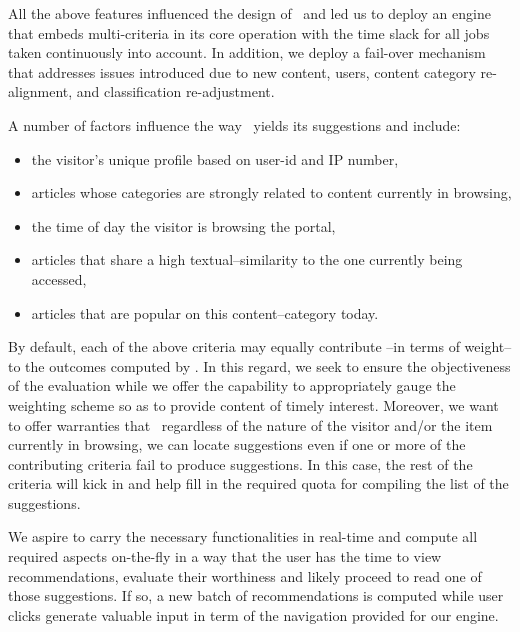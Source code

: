 All the above features influenced the design of \poly\ and led us to 
deploy an engine that embeds multi-criteria in its core operation 
with the time slack for all jobs taken continuously into account.
In addition, we deploy a fail-over mechanism that addresses 
issues introduced due to new content, users, content category re-alignment, 
and classification re-adjustment.

A number of factors influence the way \poly\ yields its suggestions and include:
\begin{itemize}
\item 
the visitor's unique profile based on user-id and IP number,
\item 	
	articles whose categories are strongly related 
	to content currently in browsing, 
\item 
	the time of day the visitor is browsing the portal,
\item 
	articles that share a high textual--similarity 
	to the one currently being accessed,
\item 
	articles that are popular on this content--category today.
\end{itemize}
By default, each of the above criteria may equally contribute
--in terms of weight--  
to the outcomes computed by \poly. 
In this regard, we seek to ensure the objectiveness of the evaluation 
while we offer the capability 
to appropriately gauge the weighting scheme so as 
to provide content of timely interest. 
Moreover, we want to offer warranties that \poly\ 
regardless of the nature of the visitor and/or the item currently in browsing, 
we can 
locate suggestions even if one or more of the contributing 
criteria fail to produce suggestions.
In this case, the rest of the criteria will kick in 
and help fill in the required quota for compiling 
the list of the suggestions.

We aspire to carry the necessary functionalities in real-time and 
compute all required aspects on-the-fly in a way that the user 
has the time to  view recommendations, evaluate their worthiness 
and likely proceed to read one of those suggestions.
If so, a new batch of recommendations is computed while 
user clicks generate valuable input in term of the navigation 
provided for our engine. 

